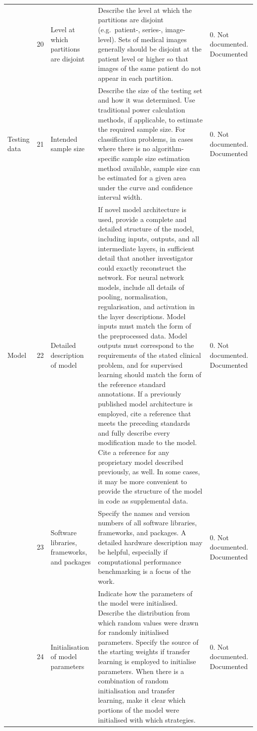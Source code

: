 \begin{landscape}
\begin{longtable}{@{}p{1.7cm}p{0.7cm}p{3.6cm}p{9.6cm}p{3.2cm}@{}}
	\addlinespace
	& 20 & Level at which partitions are disjoint & Describe the level at which the partitions are disjoint (e.g.\ patient-, series-, image-level). Sets of medical images generally should be disjoint at the patient level or higher so that images of the same patient do not appear in each partition. & 0. Not documented\newline 1. Documented \\
	\addlinespace
	Testing data & 21 & Intended sample size & Describe the size of the testing set and how it was determined. Use traditional power calculation methods, if applicable, to estimate the required sample size. For classification problems, in cases where there is no algorithm-specific sample size estimation method available, sample size can be estimated for a given area under the curve and confidence interval width. & 0. Not documented\newline 1. Documented \\
	\addlinespace
	Model & 22 & Detailed description of model & If novel model architecture is used, provide a complete and detailed structure of the model, including inputs, outputs, and all intermediate layers, in sufficient detail that another investigator could exactly reconstruct the network. For neural network models, include all details of pooling, normalisation, regularisation, and activation in the layer descriptions. Model inputs must match the form of the preprocessed data. Model outputs must correspond to the requirements of the stated clinical problem, and for supervised learning should match the form of the reference standard annotations. If a previously published model architecture is employed, cite a reference that meets the preceding standards and fully describe every modification made to the model. Cite a reference for any proprietary model described previously, as well. In some cases, it may be more convenient to provide the structure of the model in code as supplemental data. & 0. Not documented\newline 1. Documented \\
	\addlinespace
	& 23 & Software libraries, frameworks, and packages & Specify the names and version numbers of all software libraries, frameworks, and packages. A detailed hardware description may be helpful, especially if computational performance benchmarking is a focus of the work. & 0. Not documented\newline 1. Documented \\
	\addlinespace
	& 24 & Initialisation of model parameters & Indicate how the parameters of the model were initialised. Describe the distribution from which random values were drawn for randomly initialised parameters. Specify the source of the starting weights if transfer learning is employed to initialise parameters. When there is a combination of random initialisation and transfer learning, make it clear which portions of the model were initialised with which strategies. & 0. Not documented\newline 1. Documented \\

\end{longtable}
\end{landscape}
